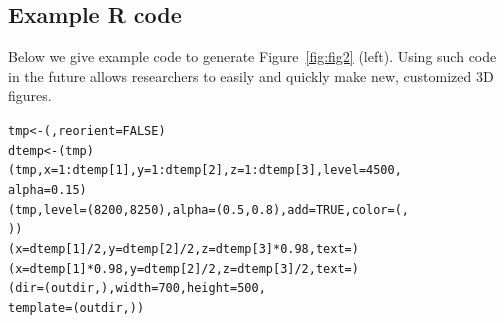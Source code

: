 \documentclass[final]{beamer}\usepackage[]{graphicx}\usepackage[]{color}
\makeatletter
\newenvironment{kframe}{%
 \def\at@end@of@kframe{}%
 \ifinner\ifhmode%
  \def\at@end@of@kframe{\end{minipage}}%
  \begin{minipage}{\columnwidth}%
 \fi\fi%
 \def\FrameCommand##1{\hskip\@totalleftmargin \hskip-\fboxsep
 \colorbox{shadecolor}{##1}\hskip-\fboxsep
     \hskip-\linewidth \hskip-\@totalleftmargin \hskip\columnwidth}%
 \MakeFramed {\advance\hsize-\width
   \@totalleftmargin\z@ \linewidth\hsize
   \@setminipage}}%
 {\par\unskip\endMakeFramed%
 \at@end@of@kframe}
\newenvironment{knitrout}{}{} %
\makeatother
\begin{document}
\begin{frame}[fragile]
\begin{multicols}{2}
\subsection{Example R code}
Below we give example code to generate Figure~\ref{fig:fig2} (left).  Using such code in the future allows researchers to easily and quickly make new, customized 3D figures.
\begin{knitrout}
\color{fgcolor}\begin{kframe}
\begin{alltt}
tmp <- (, reorient = FALSE)  
dtemp <- (tmp)  
(tmp, x = 1:dtemp[1], y = 1:dtemp[2], z = 1:dtemp[3], level = 4500, 
    alpha = 0.15)  
(tmp, level = (8200, 8250), alpha = (0.5, 0.8), add = TRUE, color = (, 
    ))  
(x = dtemp[1]/2, y = dtemp[2]/2, z = dtemp[3] * 0.98, text = )  
(x = dtemp[1] * 0.98, y = dtemp[2]/2, z = dtemp[3]/2, text = )
(dir = (outdir, ), width = 700, height = 500, 
    template = (outdir, ))  
\end{alltt}
\end{kframe}
\end{knitrout}





\end{multicols}
\end{frame}
\end{document}

